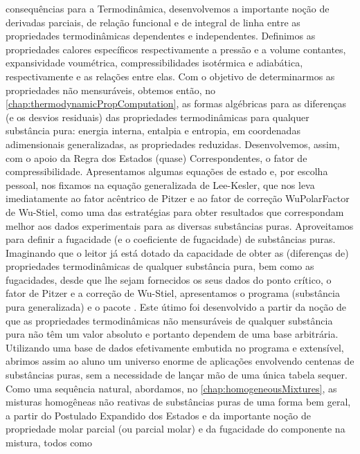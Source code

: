     consequências para a Termodinâmica, desenvolvemos a importante noção de
    derivadas parciais, de relação funcional e de integral de linha entre as
    propriedades termodinâmicas dependentes e independentes.  Definimos as
    propriedades calores específicos respectivamente a pressão e a volume
    contantes, expansividade  voumétrica, compressibilidades isotérmica e
    adiabática, respectivamente e as relações entre elas. Com o objetivo de
    determinarmos as propriedades não mensuráveis, obtemos então, no
    \cref{chap:thermodynamicPropComputation}, as formas algébricas para as
    diferenças (e os desvios residuais) das propriedades termodinâmicas para
    qualquer substância pura: energia interna, entalpia e entropia, em
    coordenadas adimensionais generalizadas, as propriedades reduzidas.
    Desenvolvemos, assim, com o apoio da Regra dos Estados (quase)
    Correspondentes, o fator de compressibilidade. Apresentamos algumas
    equações de estado e, por escolha pessoal, nos fixamos na equação
    generalizada de Lee-Kesler, que nos leva imediatamente ao fator acêntrico
    de Pitzer e ao fator de correção \gls{WuPolarFactor} de Wu-Stiel, como uma
    das estratégias para obter resultados que correspondam melhor aos dados
    experimentais para as diversas substâncias puras.  Aproveitamos para
    definir a fugacidade (e o coeficiente de fugacidade) de substâncias puras.
    Imaginando que o leitor já está dotado da capacidade de obter as
    (diferenças de) propriedades termodinâmicas de qualquer substância pura,
    bem como as fugacidades, desde que lhe sejam fornecidos os seus dados do
    ponto crítico, o fator de Pitzer e a correção de Wu-Stiel, apresentamos o
    programa  (substância pura generalizada) e o
    pacote . Este útimo  foi desenvolvido a
    partir da noção de que as propriedades termodinâmicas não mensuráveis de
    qualquer substância pura não têm um valor absoluto e portanto dependem de
    uma base arbitrária.  Utilizando uma base de dados efetivamente embutida no
    programa e extensível, abrimos assim ao aluno um universo enorme de
    aplicações envolvendo centenas de substâncias puras, sem a necessidade de
    lançar mão de uma única tabela sequer. Como uma sequência natural,
    abordamos, no \cref{chap:homogeneousMixtures}, as misturas homogêneas não
    reativas de substâncias puras de uma forma bem geral, a partir do Postulado
    Expandido dos Estados e da importante noção de propriedade molar parcial
    (ou parcial molar) e da fugacidade do componente na mistura, todos como

